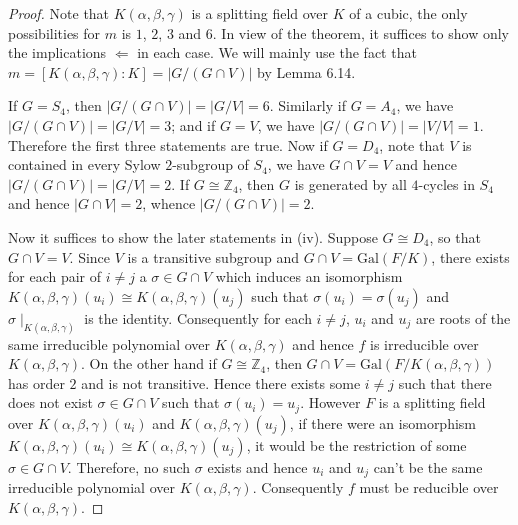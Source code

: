 \begin{proof}
Note that $K(\alpha,\beta,\gamma)$ is a splitting field over $K$ of a cubic, the only possibilities for $m$ is $1$, $2$, $3$ and $6$. In view of the theorem, it suffices to show only the implications $\Leftarrow$ in each case. We will mainly use the fact that $m=[K(\alpha,\beta,\gamma):K]=|G/(G\cap V)|$ by Lemma 6.14.\par
If $G=S_4$, then $|G/(G\cap V)|=|G/V|=6$. Similarly if $G=A_4$, we have $|G/(G\cap V)|=|G/V|=3$; and if $G=V$, we have $|G/(G\cap V)|=|V/V|=1$. Therefore the first three statements are true. Now if $G=D_4$, note that $V$ is contained in every Sylow $2$-subgroup of $S_4$, we have $G\cap V=V$ and hence $|G/(G\cap V)|=|G/V|=2$. If $G\cong\mathbb{Z}_4$, then $G$ is generated by all $4$-cycles in $S_4$ and hence $|G\cap V|=2$, whence $|G/(G\cap V)|=2$.\par
Now it suffices to show the later statements in (iv). Suppose $G\cong D_4$, so that $G\cap V=V$. Since $V$ is a transitive subgroup and $G\cap V=\mathrm{Gal}(F/K)$, there exists for each pair of $i\ne j$ a $\sigma\in G\cap V$ which induces an isomorphism $K(\alpha,\beta,\gamma)(u_i)\cong K(\alpha,\beta,\gamma)(u_j)$ such that $\sigma(u_i)=\sigma(u_j)$ and $\sigma\mid_{K(\alpha,\beta,\gamma)}$ is the identity. Consequently for each $i\ne j$, $u_i$ and $u_j$ are roots of the same irreducible polynomial over $K(\alpha,\beta,\gamma)$ and hence $f$ is irreducible over $K(\alpha,\beta,\gamma)$. On the other hand if $G\cong\mathbb{Z}_4$, then $G\cap V=\mathrm{Gal}(F/K(\alpha,\beta,\gamma))$ has order $2$ and is not transitive. Hence there exists some $i\ne j$ such that there does not exist $\sigma\in G\cap V$ such that $\sigma(u_i)=u_j$. However $F$ is a splitting field over $K(\alpha,\beta,\gamma)(u_i)$ and $K(\alpha,\beta,\gamma)(u_j)$, if there were an isomorphism $K(\alpha,\beta,\gamma)(u_i)\cong K(\alpha,\beta,\gamma)(u_j)$, it would be the restriction of some $\sigma\in G\cap V$. Therefore, no such $\sigma$ exists and hence $u_i$ and $u_j$ can't be the same irreducible polynomial over $K(\alpha,\beta,\gamma)$. Consequently $f$ must be reducible over $K(\alpha,\beta,\gamma)$.
\end{proof}
